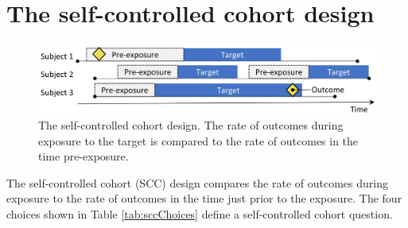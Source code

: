 \documentclass[11pt]{book}
\begin{document}
\section{The self-controlled cohort
design}\label{the-self-controlled-cohort-design}

\begin{figure}

{\centering \includegraphics[width=0.9\linewidth]{images/PopulationLevelEstimation/selfControlledCohort} 

}

\caption{The self-controlled cohort design. The rate of outcomes during exposure to the target is compared to the rate of outcomes in the time pre-exposure.}\label{fig:scc}
\end{figure}

The self-controlled cohort (SCC) design \citep{ryan_2013} compares the
rate of outcomes during exposure to the rate of outcomes in the time
just prior to the exposure. The four choices shown in Table
\ref{tab:sccChoices} define a self-controlled cohort question.
\end{document}
